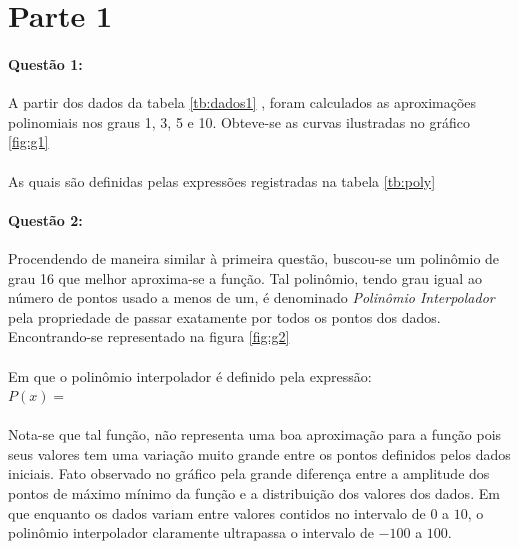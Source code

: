 \documentclass[a4paper,11pt]{article}
\title{\tituloCapa}
\begin{document}


\section{Parte 1}
\paragraph{Questão 1:}A partir dos dados da tabela \ref{tb:dados1} , foram calculados as aproximações polinomiais nos graus 1, 3, 5 e 10. Obteve-se as curvas ilustradas no gráfico \ref{fig:g1}
\paragraph{}As quais são definidas pelas expressões registradas na tabela \ref{tb:poly}


\paragraph{Questão 2:}Procendendo de maneira similar à primeira questão, buscou-se um polinômio de grau 16 que melhor aproxima-se a função. Tal polinômio, tendo grau igual ao número de pontos usado a menos de um, é denominado \textit{Polinômio Interpolador} pela propriedade de passar exatamente por todos os pontos dos dados. Encontrando-se representado na figura \ref{fig:g2}


\paragraph{}Em que o polinômio interpolador é definido pela expressão:
{\\$P(x) =$\  \centering}
\paragraph{}Nota-se que tal função, não representa uma boa aproximação para a função pois seus valores tem uma variação muito grande entre os pontos definidos pelos dados iniciais. Fato observado no gráfico pela grande diferença entre a amplitude dos pontos de máximo mínimo da função e a distribuição dos valores dos dados. Em que enquanto os dados variam entre valores contidos no intervalo de $0$ a $10$, o polinômio interpolador claramente ultrapassa o intervalo de $-100$ a $100$.
\end{document}
